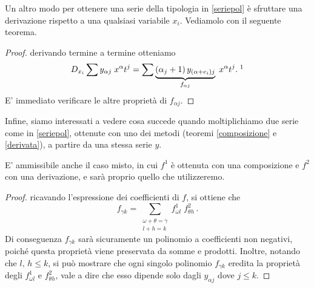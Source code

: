 Un altro modo per ottenere una serie della tipologia in \eqref{seriepol} è sfruttare una derivazione rispetto a una qualsiasi variabile $x_i$. Vediamolo con il seguente teorema.
\begin{theorem}[derivazione]\label{derivata}
\end{theorem}
\begin{proof} derivando termine a termine otteniamo
$$ D_{x_i} \sum y_{\alpha j} \; x^\alpha t^j = \sum  \underbrace{(\alpha_j+1) \, y_{(\alpha+e_i)j}}_{f_{\alpha j}} \; x^\alpha t^j. \; \footnotemark$$ 
E' immediato verificare le altre proprietà di $f_{\alpha j}$.
\end{proof}

Infine, siamo interessati a vedere cosa succede quando moltiplichiamo due serie come in \eqref{seriepol}, ottenute con uno dei metodi (teoremi \ref{composizione} e \ref{derivata}), a partire da una stessa serie $y$.
\begin{theorem}\label{prodotto}
\end{theorem}

\begin{remark}
E' ammissibile anche il caso misto, in cui $f^1$ è ottenuta con una composizione e $f^2$ con una derivazione, e sarà proprio quello che utilizzeremo.
\end{remark}

\begin{proof} ricavando l'espressione dei coefficienti di $f$, si ottiene che
$$f_{\gamma k} = \sum_{\substack{\omega+\theta=\gamma \\ l+h=k}} f^1_{\omega l}\;  f^2_{\theta h}\, .$$
Di conseguenza $f_{\gamma k}$ sarà sicuramente un polinomio a coefficienti non negativi, poiché questa proprietà viene preservata da somme e prodotti. Inoltre, notando che $l,\, h \leq k$, si può mostrare che ogni singolo polinomio $f_{\gamma k}$ eredita la proprietà degli $f^1_{\omega l}$ e $f^2_{\theta h}$, vale a dire che esso dipende solo dagli $y_{\alpha j}$ dove $j \leq k$.
\end{proof}

